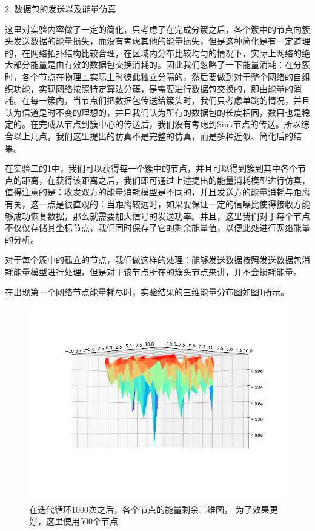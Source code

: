 \documentclass[UTF8]{article} %
\begin{document}
	 
	2. 数据包的发送以及能量仿真
	
	这里对实验内容做了一定的简化，只考虑了在完成分簇之后，各个簇中的节点向簇头发送数据的能量损失，而没有考虑其他的能量损失，但是这种简化是有一定道理的，在网络拓扑结构比较合理，在区域内分布比较均匀的情况下，实际上网络的绝大部分能量是由有效的数据包交换消耗的。因此我们忽略了一下能量消耗：在分簇时，各个节点在物理上实际上时彼此独立分隔的，然后要做到对于整个网络的自组织功能，实现网络按照特定算法分簇，是需要进行数据包交换的，即由能量的消耗。在每一簇内，当节点们把数据包传送给簇头时，我们只考虑单跳的情况，并且认为信道是时不变的理想的，并且我们认为所有的数据包的长度相同，数目也是稳定的。在完成从节点到簇中心的传送后，我们没有考虑到Sink节点的传送。所以综合以上几点，我们这里提出的仿真不是完整的仿真，而是多种近似、简化后的结果。
	
	在实验二的1中，我们可以获得每一个簇中的节点，并且可以得到簇到其中各个节点的距离，在获得该距离之后，我们即可通过上述提出的能量消耗模型进行仿真，值得注意的是：收发双方的能量消耗模型是不同的，并且发送方的能量消耗与距离有关，这一点是很直观的：当距离较远时，如果要保证一定的信噪比使得接收方能够成功恢复数据，那么就需要加大信号的发送功率。并且，这里我们对于每个节点不仅仅存储其坐标节点，我们同时保存了它的剩余能量值，以便此处进行网络能量的分析。
	
	对于每个簇中的孤立的节点，我们做这样的处理：能够发送数据按照发送数据包消耗能量模型进行处理，但是对于该节点所在的簇头节点来讲，并不会损耗能量。
	
	在出现第一个网络节点能量耗尽时，实验结果的三维能量分布图如图\ref{fig:figure3}所示。
	\begin{figure}[H]
		\centering
		\includegraphics[width=0.7\linewidth]{Figure_3}
		\caption{在迭代循环1000次之后，各个节点的能量剩余三维图， 为了效果更好，这里使用500个节点}
		\label{fig:figure3}
	\end{figure}
	
\end{document}
